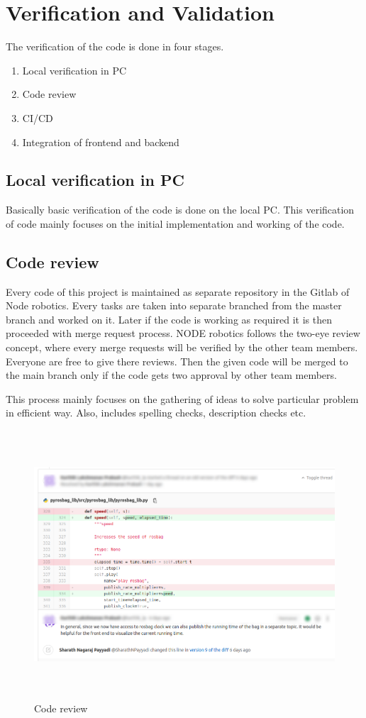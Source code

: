 \chapter{Verification and Validation}
The verification of the code is done in four stages.
\begin{enumerate}
	\item Local verification in PC
	\item Code review
	\item CI/CD
	\item Integration of frontend and backend
\end{enumerate}

\section{Local verification in PC}
Basically basic verification of the code is done on the local PC. This verification of code mainly focuses on the initial implementation and working of the code.
 
\section{Code review}
Every code of this project is maintained as separate repository in the Gitlab of Node robotics. Every tasks are taken into separate branched from the master branch and worked on it. Later if the code is working as required it is then proceeded with merge request process. NODE robotics follows the two-eye review concept, where every merge requests will be verified by the other team members. Everyone are free to give there reviews. Then the given code will be merged to the main branch only if the code gets two approval by other team members. 

This process mainly focuses on the gathering of ideas to solve particular problem in efficient way. Also, includes spelling checks, description checks etc.
\begin{figure}[h]
	\begin{center}
		\includegraphics[height=10cm,width=\linewidth]{images/code-review.png}
		\caption{Code review}
	\end{center}
\end{figure}
 
